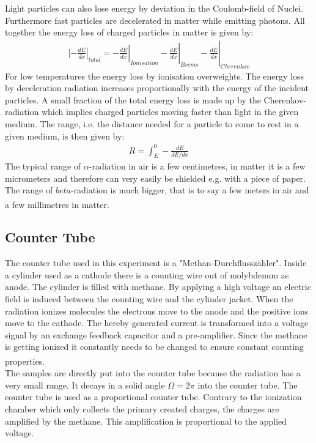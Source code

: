 \documentclass[12pt]{article}
\begin{document}
Light particles can also lose energy by deviation in the Coulomb-field of Nuclei. Furthermore fast particles are decelerated in matter while emitting photons. All together the energy loss of charged particles in matter is given by:
\begin{align}
[\left. \left.\left.\left. -\frac{dE}{dx}\right| _{total}=-\frac{dE}{dx}\right| _{Ionisation}-\frac{dE}{dx}\right|  _{Brems}-\frac{dE}{dx}\right| _{Cherenkov}
\end{align}
For low temperatures the energy loss by ionisation overweights. The energy loss by deceleration radiation increases proportionally with the energy of the incident particles. A small fraction of the total energy loss is made up by the Cherenkov-radiation which implies charged particles moving faster than light in the given medium. The range, i.e. the distance needed for a particle to come to rest in a given medium, is then given by:
\begin{align}
R=\int_{E}^{0}-\frac{dE}{dE/dx}
\end{align}
The typical range of $\alpha$-radiation in air is a few centimetres, in matter it is a few micrometers and therefore can very easily be shielded e.g. with a piece of paper.
The range of $beta$-radiation is much bigger, that is to say a few meters in air and a few millimetres in matter. \textsuperscript{\cite{staat}}

 \subsection{Counter Tube \label{CT}}
 
 The counter tube used in this experiment is a "Methan-Durchflusszähler". Inside a cylinder used as a cathode there is a counting wire out of molybdenum as anode. The cylinder is filled with methane. By applying a high voltage an electric field is induced between the counting wire and the cylinder jacket. When the radiation ionizes molecules the electrons move to the anode and the positive ions move to the cathode. The hereby generated current is transformed into a voltage signal by an exchange feedback capacitor and a pre-amplifier.
 Since the methane is getting ionized it constantly needs to be changed to ensure constant counting properties. \textsuperscript{\cite{staat}} \textsuperscript{\cite{Creutz}}\\
 
 The samples are directly put into the counter tube because the radiation has a very small range. It decays in a solid angle $\Omega=2\pi$ into the counter tube. The counter tube is used as a proportional counter tube. Contrary to the ionization chamber which only collects the primary created charges, the charges are amplified by the methane. This amplification is proportional to the applied voltage.
 
\end{document}
